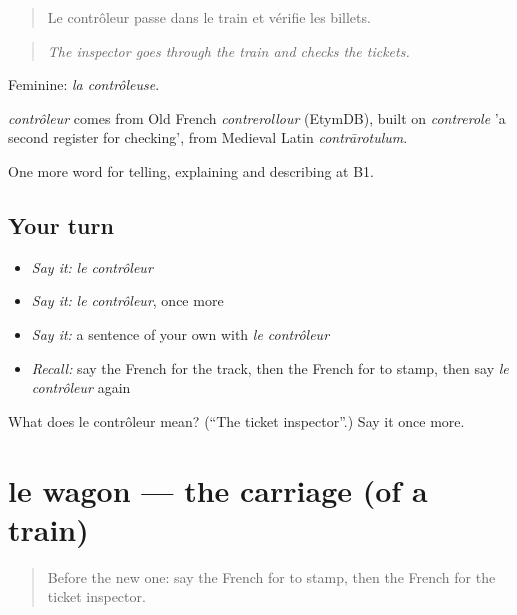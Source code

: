 \begin{quote}
Le contrôleur passe dans le train et vérifie les billets.
\end{quote}

\begin{quote}
\emph{The inspector goes through the train and checks the tickets.}
\end{quote}

Feminine: \emph{la contrôleuse}.

\begin{cousinweb}
\emph{contrôleur} comes from Old French \emph{contrerollour} (EtymDB), built on \emph{contrerole} 'a second register for checking', from Medieval Latin \emph{contrārotulum}.
\end{cousinweb}

\begin{grammarlens}[title={What you've built}]
One more word for telling, explaining and describing at B1.
\end{grammarlens}

\subsection*{Your turn}
\begin{itemize}
\raggedright
  \item \emph{Say it:} \emph{le contrôleur}
  \item \emph{Say it:} \emph{le contrôleur}, once more
  \item \emph{Say it:} a sentence of your own with \emph{le contrôleur}
  \item \emph{Recall:} say the French for the track, then the French for to stamp, then say \emph{le contrôleur} again
\end{itemize}

\begin{tcolorbox}[breakable,colback=teal!4,colframe=teal!35!black,title={Before you move on}]
What does le contrôleur mean? (\textquotedblleft{}The ticket inspector\textquotedblright{}.) Say it once more.
\end{tcolorbox}
\section[le wagon]{le wagon — the carriage (of a train)}

\label{lesson:FR-C413-wagon}



\begin{quote}
Before the new one: say the French for to stamp, then the French for the ticket inspector.
\end{quote}

